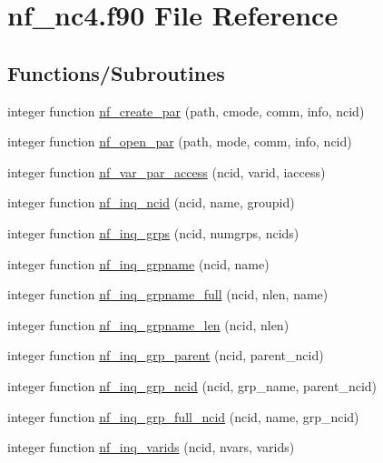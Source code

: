 \hypertarget{nf__nc4_8f90}{}\section{nf\+\_\+nc4.\+f90 File Reference}
\label{nf__nc4_8f90}
\subsection*{Functions/\+Subroutines}
\begin{DoxyCompactItemize}
\item 
integer function \hyperlink{nf__nc4_8f90_a162dee8c95d5dce3ec0b5bbeb5624d4a}{nf\+\_\+create\+\_\+par} (path, cmode, comm, info, ncid)
\item 
integer function \hyperlink{nf__nc4_8f90_ab7b8fd403c3781b74a8c4a7cbfe1458f}{nf\+\_\+open\+\_\+par} (path, mode, comm, info, ncid)
\item 
integer function \hyperlink{nf__nc4_8f90_a918cdfbb2e46c4d138b0fe1deda0fabb}{nf\+\_\+var\+\_\+par\+\_\+access} (ncid, varid, iaccess)
\item 
integer function \hyperlink{nf__nc4_8f90_aca28d2a726e7981618924ea21d03d8df}{nf\+\_\+inq\+\_\+ncid} (ncid, name, groupid)
\item 
integer function \hyperlink{nf__nc4_8f90_a96bc3dc03724b5b56b66c007d718e469}{nf\+\_\+inq\+\_\+grps} (ncid, numgrps, ncids)
\item 
integer function \hyperlink{nf__nc4_8f90_a4f4d483535b5162b27baa41a09e396bc}{nf\+\_\+inq\+\_\+grpname} (ncid, name)
\item 
integer function \hyperlink{nf__nc4_8f90_aea3bc6ceef0b64f33289cab0cedbc302}{nf\+\_\+inq\+\_\+grpname\+\_\+full} (ncid, nlen, name)
\item 
integer function \hyperlink{nf__nc4_8f90_ab9eaa313ab271f6ff25d99c62a3f6a68}{nf\+\_\+inq\+\_\+grpname\+\_\+len} (ncid, nlen)
\item 
integer function \hyperlink{nf__nc4_8f90_a9b77fa66e690b8b97322f8c92c528bb7}{nf\+\_\+inq\+\_\+grp\+\_\+parent} (ncid, parent\+\_\+ncid)
\item 
integer function \hyperlink{nf__nc4_8f90_a8f1edecefc4e38f9faee088c2b195ee9}{nf\+\_\+inq\+\_\+grp\+\_\+ncid} (ncid, grp\+\_\+name, parent\+\_\+ncid)
\item 
integer function \hyperlink{nf__nc4_8f90_a40a10a8cf3a28c89236a937907af39cf}{nf\+\_\+inq\+\_\+grp\+\_\+full\+\_\+ncid} (ncid, name, grp\+\_\+ncid)
\item 
integer function \hyperlink{nf__nc4_8f90_a04f0d3dae060df0db05ae09847afc3bb}{nf\+\_\+inq\+\_\+varids} (ncid, nvars, varids)

\end{DoxyCompactItemize}
